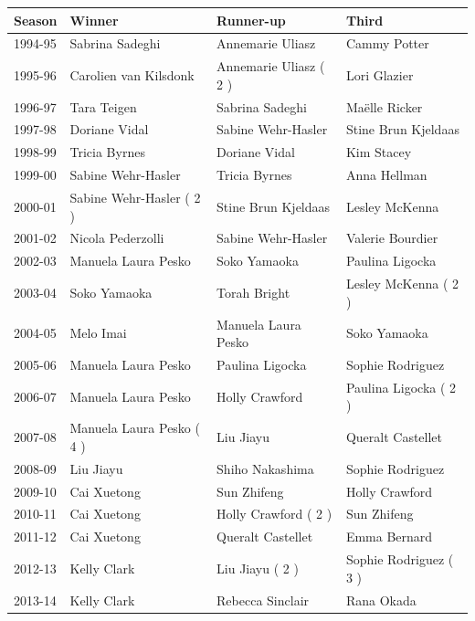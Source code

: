 \documentclass{article}
\begin{document}
\begin{tabular}{llll}
\toprule
Season & Winner & Runner-up & Third \\
\midrule
1994-95 & Sabrina Sadeghi & Annemarie Uliasz & Cammy Potter \\
1995-96 & Carolien van Kilsdonk & Annemarie Uliasz ( 2 ) & Lori Glazier \\
1996-97 & Tara Teigen & Sabrina Sadeghi & Maëlle Ricker \\
1997-98 & Doriane Vidal & Sabine Wehr-Hasler & Stine Brun Kjeldaas \\
1998-99 & Tricia Byrnes & Doriane Vidal & Kim Stacey \\
1999-00 & Sabine Wehr-Hasler & Tricia Byrnes & Anna Hellman \\
2000-01 & Sabine Wehr-Hasler ( 2 ) & Stine Brun Kjeldaas & Lesley McKenna \\
2001-02 & Nicola Pederzolli & Sabine Wehr-Hasler & Valerie Bourdier \\
2002-03 & Manuela Laura Pesko & Soko Yamaoka & Paulina Ligocka \\
2003-04 & Soko Yamaoka & Torah Bright & Lesley McKenna ( 2 ) \\
2004-05 & Melo Imai & Manuela Laura Pesko & Soko Yamaoka \\
2005-06 & Manuela Laura Pesko & Paulina Ligocka & Sophie Rodriguez \\
2006-07 & Manuela Laura Pesko & Holly Crawford & Paulina Ligocka ( 2 ) \\
2007-08 & Manuela Laura Pesko ( 4 ) & Liu Jiayu & Queralt Castellet \\
2008-09 & Liu Jiayu & Shiho Nakashima & Sophie Rodriguez \\
2009-10 & Cai Xuetong & Sun Zhifeng & Holly Crawford \\
2010-11 & Cai Xuetong & Holly Crawford ( 2 ) & Sun Zhifeng \\
2011-12 & Cai Xuetong & Queralt Castellet & Emma Bernard \\
2012-13 & Kelly Clark & Liu Jiayu ( 2 ) & Sophie Rodriguez ( 3 ) \\
2013-14 & Kelly Clark & Rebecca Sinclair & Rana Okada \\
\bottomrule
\end{tabular}
\end{document}

